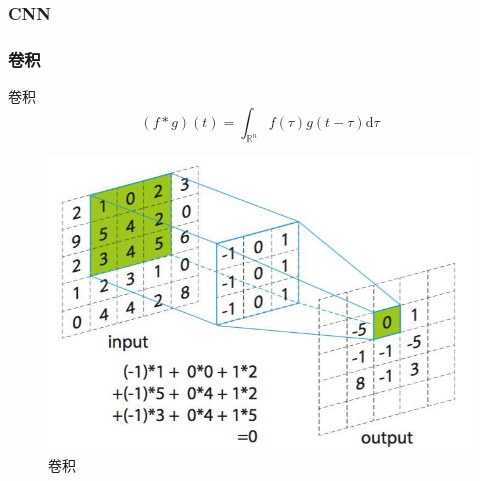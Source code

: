 \subsubsection{CNN}
\begin{frame}
    \frametitle{卷积}
    \begin{definition}{卷积}
        \begin{equation}
            (f*g)(t)=\int_{\mathbb{R}^n}f(\tau)g(t-\tau)\mathrm{d}\tau
        \end{equation}
    \end{definition}

        \begin{figure}
            \includegraphics[width=0.5\linewidth]{../lib/CNN.jpeg}
            \caption{卷积}
            \label{CNN}
        \end{figure}

\end{frame}
